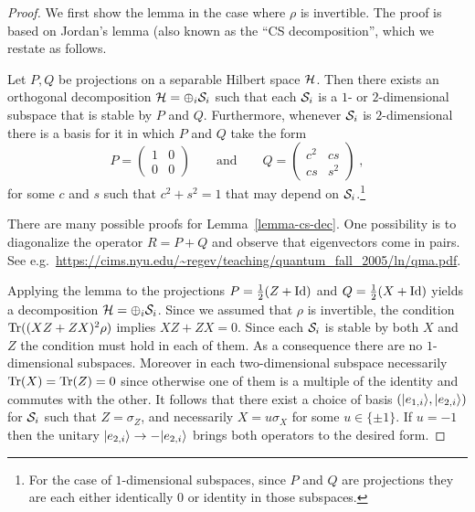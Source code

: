 \begin{proof}
We first show the lemma in the case where $\rho$ is invertible. The proof is based on Jordan's lemma (also known as the ``CS decomposition'', which we restate as follows. 


\begin{lemma}\label{lemma-cs-dec}
Let $P,Q$ be projections on a separable Hilbert space $\mathcal{H}$. Then there exists an orthogonal decomposition $\mathcal{H} = \oplus_i \mathcal{S}_i$ such that each $\mathcal{S}_i$ is a $1$- or $2$-dimensional subspace that is stable by $P$ and $Q$. Furthermore, whenever $\mathcal{S}_i$ is $2$-dimensional there is a basis for it in which $P$ and $Q$ take the form
\begin{equation}\label{eq:pq-form}
 P = \begin{pmatrix} 1 & 0 \\ 0 & 0 \end{pmatrix} \qquad \text{and} \qquad Q = \begin{pmatrix} c^2 & cs \\ cs & s^2 \end{pmatrix}\;,
\end{equation}
 for some $c$ and $s$ such that $c^2+s^2=1$ that may depend on $\mathcal{S}_i$.\footnote{For the case of $1$-dimensional subspaces, since $P$ and $Q$ are projections they are each either identically $0$ or identity in those subspaces.}
\end{lemma} 

There are many possible proofs for Lemma~\ref{lemma-cs-dec}. One possibility is to diagonalize the operator $R=P+Q$ and observe that eigenvectors come in pairs. See e.g.~\url{https://cims.nyu.edu/~regev/teaching/quantum_fall_2005/ln/qma.pdf}. 

Applying the lemma to the projections $P = \frac{1}{2}(Z+\mathop{\rm Id}\nolimits)$ and $Q = \frac{1}{2}(X+\mathop{\rm Id}\nolimits)$ yields a decomposition $\mathcal{H} = \oplus_i \mathcal{S}_i$. Since we assumed that $\rho$ is invertible, the condition $\mathrm{Tr}((XZ+ZX)^2\rho)$ implies $XZ+ZX=0$. Since each $\mathcal{S}_i$ is stable by both $X$ and $Z$ the condition must hold in each of them. As a consequence there are no $1$-dimensional subspaces. Moreover in each two-dimensional subspace necessarily $\mathrm{Tr}(X)=\mathrm{Tr}(Z)=0$ since otherwise one of them is a multiple of the identity and commutes with the other. It follows that there exist a choice of basis $(|e_{1,i}\rangle,|e_{2,i}\rangle)$ for $\mathcal{S}_i$ such that $Z = \sigma_Z$, and necessarily $X = u \sigma_X$ for some $u\in \{\pm 1\}$. If $u=-1$ then the unitary $|e_{2,i}\rangle \to - |e_{2,i}\rangle$ brings both operators to the desired form. 


\end{proof}
